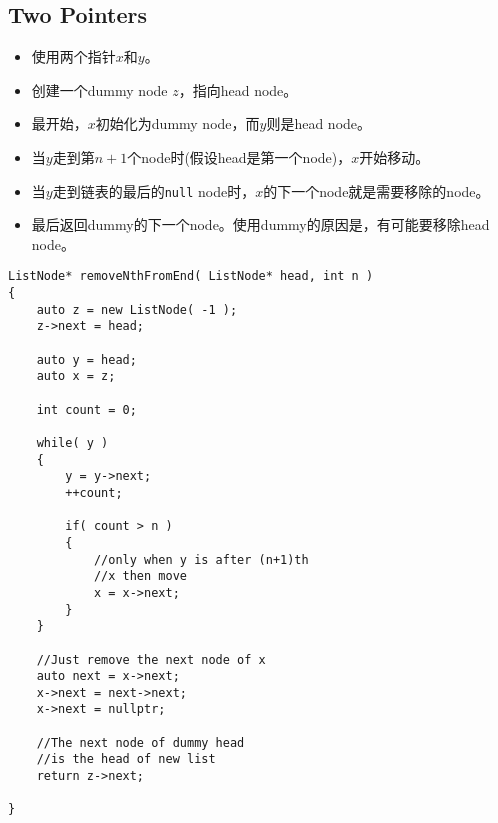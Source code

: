 \subsection{Two Pointers}
\begin{itemize}
\item 使用两个指针$ x $和$ y $。
\item 创建一个dummy node $ z $，指向head node。
\item 最开始，$ x $初始化为dummy node，而$ y $则是head node。
\item 当$ y $走到第$n+1$个node时(假设head是第一个node)，$ x $开始移动。
\item 当$ y $走到链表的最后的\texttt{null} node时，$ x $的下一个node就是需要移除的node。
\item 最后返回dummy的下一个node。使用dummy的原因是，有可能要移除head node。
\end{itemize}

\setcounter{lstlisting}{0}
\begin{lstlisting}[style=customc, caption={Two Pointers}]
ListNode* removeNthFromEnd( ListNode* head, int n )
{
    auto z = new ListNode( -1 );
    z->next = head;

    auto y = head;
    auto x = z;

    int count = 0;

    while( y )
    {
        y = y->next;
        ++count;

        if( count > n )
        {
            //only when y is after (n+1)th
            //x then move
            x = x->next;
        }
    }

    //Just remove the next node of x
    auto next = x->next;
    x->next = next->next;
    x->next = nullptr;

    //The next node of dummy head
    //is the head of new list
    return z->next;

}

\end{lstlisting}
